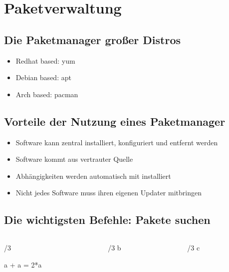 \documentclass[
    ngerman,
    accentcolor=3b,
    dark_mode,
    fontsize= 12pt,
    a4paper,
    aspectratio=169,
    colorback=true,
    fancy_row_colors,
    leqno,
    fleqn,
    boxarc=3pt,
    fleqn,
]{algoslides}
\begin{document}
    \section{Paketverwaltung}\label{package-management}\label{Paketverwaltung}
    \subsection{Die Paketmanager großer Distros}
    \begin{frame}
        \slidehead{}
        \begin{itemize}
            \item Redhat based: {\ttfamily yum}
            \item Debian based: {\ttfamily apt}
            \item Arch based: {\ttfamily pacman}
        \end{itemize}
    \end{frame}
    \subsection{Vorteile der Nutzung eines Paketmanager}
    \begin{frame}
        \slidehead{}
        \begin{itemize}
            \item Software kann zentral installiert, konfiguriert und entfernt werden
            \item Software kommt aus vertrauter Quelle
            \item Abhängigkeiten werden automatisch mit installiert
            \item Nicht jedes Software muss ihren eigenen Updater mitbringen
        \end{itemize}
    \end{frame}
    \subsection{Die wichtigsten Befehle: Pakete suchen}
    \begin{frame}[fragile]
        \slidehead{}
        \begin{columns}
            \begin{column}[c]{\textwidth/3}
                \begin{codeBlock}[]{}
                    a + a = 2*a
                \end{codeBlock}
            \end{column}
            \begin{column}[c]{\textwidth/3}
                b
            \end{column}
            \begin{column}[c]{\textwidth/3}
                c
            \end{column}
        \end{columns}
    \end{frame}
\end{document}
